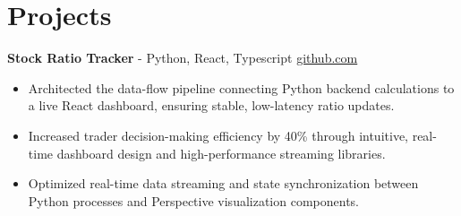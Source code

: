 \documentclass[11pt]{article}       %
\begin{document}

\vspace{-18.5pt}

\section*{Projects}

\textbf{Stock Ratio Tracker}{ - Python, React, Typescript} \hfill \href{https://github.com/Monica20030707/tradingDashboard-UI}{github.com} \\
\vspace{-9pt}
\begin{itemize}
  \item Architected the data-flow pipeline connecting Python backend calculations to a live React dashboard, ensuring stable, low-latency ratio updates. 
  \item Increased trader decision-making efficiency by 40\% through intuitive, real-time dashboard design and high-performance streaming libraries.
  \item Optimized real-time data streaming and state synchronization between Python processes and Perspective visualization components.
\end{itemize}

\end{document}
